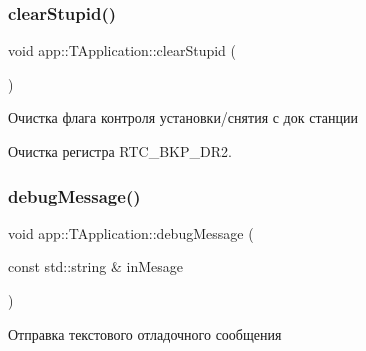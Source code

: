 \subsubsection{\texorpdfstring{clear\+Stupid()}{clearStupid()}}
{\footnotesize\ttfamily void app\+::\+T\+Application\+::clear\+Stupid (\begin{DoxyParamCaption}{ }\end{DoxyParamCaption})}



Очистка флага контроля установки/снятия с док станции 



 Очистка регистра R\+T\+C\+\_\+\+B\+K\+P\+\_\+\+D\+R2. \mbox{\label{classapp_1_1_t_application_abec229b87538c5db318ef57f25f6e84d}} 
\subsubsection{\texorpdfstring{debug\+Message()}{debugMessage()}\hspace{0.1cm}{\footnotesize\ttfamily [1/4]}}
{\footnotesize\ttfamily void app\+::\+T\+Application\+::debug\+Message (\begin{DoxyParamCaption}\item[{const std\+::string \&}]{in\+Mesage }\end{DoxyParamCaption})}



Отправка текстового отладочного сообщения 


